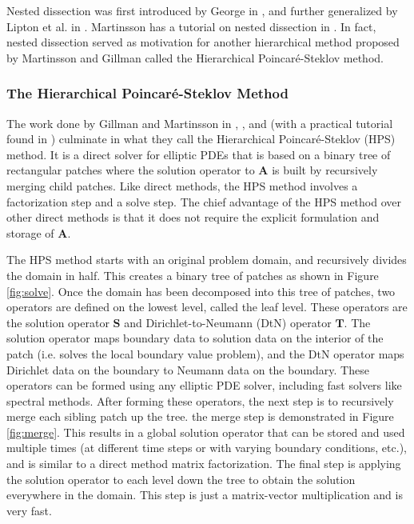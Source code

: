 Nested dissection was first introduced by George in \citep{george1973nested}, and further generalized by Lipton et al. in \citep{lipton1979generalized}. Martinsson has a tutorial on nested dissection in \citep{martinsson2019fast}. In fact, nested dissection served as motivation for another hierarchical method proposed by Martinsson and Gillman called the Hierarchical Poincaré-Steklov method.

\subsubsection{The Hierarchical Poincaré-Steklov Method}
\label{subsub:hps-method}

The work done by Gillman and Martinsson in \citep{martinsson2004fast}, \citep{MARTINSSON2013460}, and \citep{gillman2014direct} (with a practical tutorial found in \citep{martinsson2015hierarchical}) culminate in what they call the Hierarchical Poincaré-Steklov (HPS) method. It is a direct solver for elliptic PDEs that is based on a binary tree of rectangular patches where the solution operator to $\textbf{A}$ is built by recursively merging child patches. Like direct methods, the HPS method involves a factorization step and a solve step. The chief advantage of the HPS method over other direct methods is that it does not require the explicit formulation and storage of $\textbf{A}$.

The HPS method starts with an original problem domain, and recursively divides the domain in half. This creates a binary tree of patches as shown in Figure \ref{fig:solve}. Once the domain has been decomposed into this tree of patches, two operators are defined on the lowest level, called the leaf level. These operators are the solution operator $\textbf{S}$ and Dirichlet-to-Neumann (DtN) operator $\textbf{T}$. The solution operator maps boundary data to solution data on the interior of the patch (i.e. solves the local boundary value problem), and the DtN operator maps Dirichlet data on the boundary to Neumann data on the boundary. These operators can be formed using any elliptic PDE solver, including fast solvers like spectral methods. After forming these operators, the next step is to recursively merge each sibling patch up the tree. the merge step is demonstrated in Figure \ref{fig:merge}. This results in a global solution operator that can be stored and used multiple times (at different time steps or with varying boundary conditions, etc.), and is similar to a direct method matrix factorization. The final step is applying the solution operator to each level down the tree to obtain the solution everywhere in the domain. This step is just a matrix-vector multiplication and is very fast.

